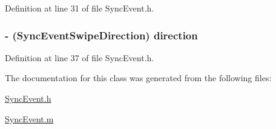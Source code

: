 Definition at line 31 of file SyncEvent.h.

\hypertarget{interface_sync_event_af2e9a1b1dcae54a6d29d4ab3ea82ac36}{
\subsubsection[{direction}]{\setlength{\rightskip}{0pt plus 5cm}-\/ ({\bf SyncEventSwipeDirection}) direction}}
\label{interface_sync_event_af2e9a1b1dcae54a6d29d4ab3ea82ac36}


Definition at line 37 of file SyncEvent.h.



The documentation for this class was generated from the following files:\begin{DoxyCompactItemize}
\item 
\hyperlink{_sync_event_8h}{SyncEvent.h}\item 
\hyperlink{_sync_event_8m}{SyncEvent.m}\end{DoxyCompactItemize}
